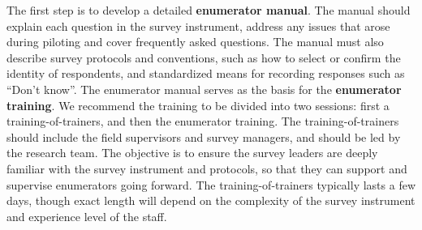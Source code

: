 The first step is to develop a detailed \textbf{enumerator manual}.
The manual should explain each question in the survey instrument,
address any issues that arose during piloting
and cover frequently asked questions.
The manual must also describe survey protocols and conventions,
such as how to select or confirm the identity of respondents,
and standardized means for recording responses such as ``Don't know''.
The enumerator manual serves as the basis for the \textbf{enumerator training}.
We recommend the training to be divided into two sessions:
first a training-of-trainers, and then the enumerator training. 
The training-of-trainers should include the field supervisors and survey managers, 
and should be led by the research team.
The objective is to ensure the survey leaders are 
deeply familiar with the survey instrument and protocols,
so that they can support and supervise enumerators going forward. 
The training-of-trainers typically lasts a few days,
though exact length will depend on the complexity of the 
survey instrument and experience level of the staff. 


